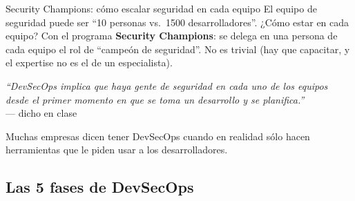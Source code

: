 \documentclass[11pt,a4paper]{article}
\newcommand{\prof}[1]{\par\medskip\noindent\textit{``#1''}\\[-2pt]\hspace*{1em}%
  {\footnotesize\textcolor{black!60}{--- dicho en clase}}\par\medskip\noindent}
\begin{document}
\begin{center}
\end{center}

\begin{anecbox}{Security Champions: cómo escalar seguridad en cada equipo}
El equipo de seguridad puede ser ``10 personas vs.\ 1500 desarrolladores''. ¿Cómo estar en cada
equipo? Con el programa \textbf{Security Champions}: se delega en una persona de cada equipo el
rol de ``campeón de seguridad''. No es trivial (hay que capacitar, y el expertise no es el de un
especialista). \prof{DevSecOps implica que haya gente de seguridad en cada uno de los equipos
desde el primer momento en que se toma un desarrollo y se planifica.} Muchas empresas dicen tener
DevSecOps cuando en realidad sólo hacen herramientas que le piden usar a los desarrolladores.
\end{anecbox}

\subsection{Las 5 fases de DevSecOps}
\end{document}
